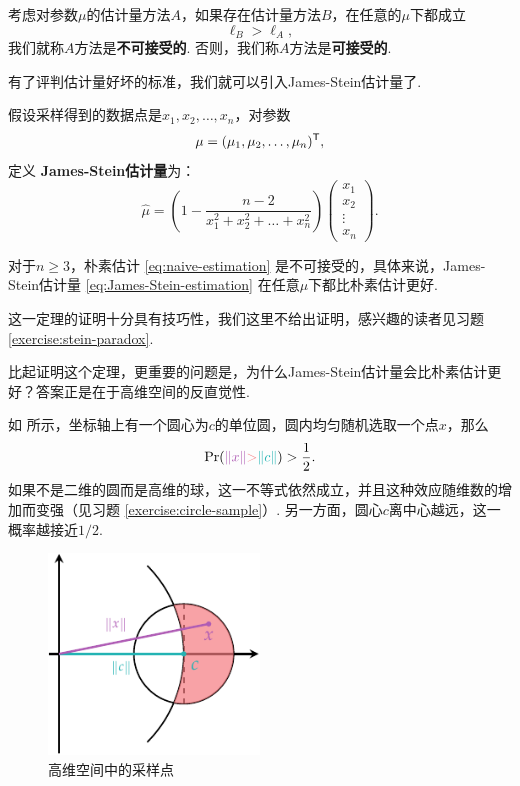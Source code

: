 \begin{definition}[可接受性]
考虑对参数$\mu$的估计量方法$A$，如果存在估计量方法$B$，在任意的$\mu$下都成立
\[\ell_B > \ell_A,\]
我们就称$A$方法是\textbf{不可接受的}. 否则，我们称$A$方法是\textbf{可接受的}. 
\end{definition}

有了评判估计量好坏的标准，我们就可以引入James-Stein估计量了. 

\begin{definition}
假设采样得到的数据点是$x_1,x_2,\dots,x_n$，对参数
\[\mu=(\mu_1,\mu_2,\dots,\mu_n)^{\mathsf{T}},\]
定义 \textbf{James-Stein估计量}为：
\begin{equation}
    \hat{\mu} = \left(1 - \frac{n-2}{x_1^2+x_2^2+\dots+x_n^2}\right)\begin{pmatrix}
        x_1 \\ x_2 \\ \vdots \\ x_n
        \end{pmatrix}.\label{eq:James-Stein-estimation}        
\end{equation}
\end{definition}

\begin{theorem}[Stein悖论]\label{thm:stein-paradox}
    对于$n\geq 3$，朴素估计 \eqref{eq:naive-estimation} 是不可接受的，具体来说，James-Stein估计量 \eqref{eq:James-Stein-estimation} 在任意$\mu$下都比朴素估计更好. 
\end{theorem}

这一定理的证明十分具有技巧性，我们这里不给出证明，感兴趣的读者见习题 \ref{exercise:stein-paradox}.

比起证明这个定理，更重要的问题是，为什么James-Stein估计量会比朴素估计更好？答案正是在于高维空间的反直觉性. 

如 所示，坐标轴上有一个圆心为$c$的单位圆，圆内均匀随机选取一个点$x$，那么
\[
\Pr(\light{\norm{x}} \textcolor{Salmon}{>} \contrastlight{\norm{c}}) > \frac{1}{2}.
\]
如果不是二维的圆而是高维的球，这一不等式依然成立，并且这种效应随维数的增加而变强（见习题 \ref{exercise:circle-sample}）. 另一方面，圆心$c$离中心越远，这一概率越接近$1/2$. 

\begin{figure}[ht]
    \centering
    \includegraphics[width=0.5\textwidth]{figures/J-L-lemma/stein.pdf}
    \caption{高维空间中的采样点}
    \label{fig:circle-sample}
\end{figure}


